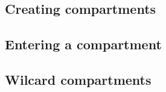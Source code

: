 \subsection{Creating compartments}

\subsection{Entering a compartment}

\subsection{Wilcard compartments}

